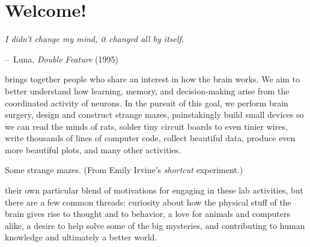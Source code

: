 \documentclass{tufte-book}
\makeatletter
\newenvironment{chapquote}[2][2em]
  {\setlength{\@tempdima}{#1}%
   \def\chapquote@author{#2}%
   \parshape 1 \@tempdima \dimexpr\textwidth-2\@tempdima\relax%
   \itshape}
  {\par\normalfont\hfill--\ \chapquote@author\hspace*{\@tempdima}\par\bigskip}
\makeatother
\begin{document}
\setcounter{tocdepth}{1}
\tableofcontents

\chapter{Welcome!}

\begin{chapquote}{Luna, {\it Double Feature} (1995)}
I didn't change my mind, it changed all by itself.
\end{chapquote}

 brings together people who share an
interest in how the brain works. We aim to better understand how
learning, memory, and decision-making arise from the coordinated
activity of neurons. In the pursuit of this goal, we perform brain
surgery, design and construct strange mazes, painstakingly build small
devices so we can read the minds of rats, solder tiny circuit boards
to even tinier wires, write thousands of lines of computer code,
collect beautiful data, produce even more beautiful plots, and many
other activities.

\begin{marginfigure}[-4cm]
\caption{Some strange mazes. (From Emily Irvine's {\it shortcut} experiment.)}
\label{fig:shortcut}
\end{marginfigure}

 their own particular blend of
motivations for engaging in these lab activities, but there are a few
common threads: curiosity about how the physical stuff of the brain
gives rise to thought and to behavior, a love for animals and
computers alike, a desire to help solve some of the big mysteries, and
contributing to human knowledge and ultimately a better world.
\end{document}
